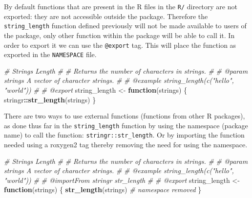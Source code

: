 \documentclass[
]{krantz}
\makeatletter
\newenvironment{Shaded}{\begin{snugshade}}{\end{snugshade}}
\newcommand{\CommentTok}[1]{\textcolor[rgb]{0.37,0.37,0.37}{\textit{#1}}}
\newcommand{\ControlFlowTok}[1]{\textcolor[rgb]{0.27,0.27,0.27}{\textbf{#1}}}
\newcommand{\KeywordTok}[1]{\textcolor[rgb]{0.27,0.27,0.27}{\textbf{#1}}}
\newcommand{\NormalTok}[1]{#1}
\newcommand{\OperatorTok}[1]{\textcolor[rgb]{0.43,0.43,0.43}{\textbf{#1}}}
\newcommand{\StringTok}[1]{\textcolor[rgb]{0.5,0.5,0.5}{#1}}
\newenvironment{kframe}{%
\medskip{}
\setlength{\fboxsep}{.8em}
 \def\at@end@of@kframe{}%
 \ifinner\ifhmode%
  \def\at@end@of@kframe{\end{minipage}}%
  \begin{minipage}{\columnwidth}%
 \fi\fi%
 \def\FrameCommand##1{\hskip\@totalleftmargin \hskip-\fboxsep
 \colorbox{shadecolor}{##1}\hskip-\fboxsep
     \hskip-\linewidth \hskip-\@totalleftmargin \hskip\columnwidth}%
 \MakeFramed {\advance\hsize-\width
   \@totalleftmargin\z@ \linewidth\hsize
   \@setminipage}}%
 {\par\unskip\endMakeFramed%
 \at@end@of@kframe}
\renewenvironment{Shaded}{\begin{kframe}}{\end{kframe}}
\makeatother
\begin{document}
By default functions that are present in the R files in the \texttt{R/} directory are not exported: they are not accessible outside the package. Therefore the \texttt{string\_length} function defined previously will not be made available to users of the package, only other function within the package will be able to call it. In order to export it we can use the \texttt{@export} tag. This will place the function as exported in the \texttt{NAMESPACE} file.

\begin{Shaded}
\begin{Highlighting}[]
\CommentTok{\#\textquotesingle{} Strings Length}
\CommentTok{\#\textquotesingle{} }
\CommentTok{\#\textquotesingle{} Returns the number of characters in strings. }
\CommentTok{\#\textquotesingle{} }
\CommentTok{\#\textquotesingle{} @param strings A vector of character strings.}
\CommentTok{\#\textquotesingle{} }
\CommentTok{\#\textquotesingle{} @example string\_length(c("hello", "world"))}
\CommentTok{\#\textquotesingle{} }
\CommentTok{\#\textquotesingle{} @export}
\NormalTok{string\_length \textless{}{-}}\StringTok{ }\ControlFlowTok{function}\NormalTok{(strings) \{}
\NormalTok{  stringr}\OperatorTok{::}\KeywordTok{str\_length}\NormalTok{(strings)}
\NormalTok{\}}
\end{Highlighting}
\end{Shaded}

There are two ways to use external functions (functions from other R packages), as done thus far in the \texttt{string\_length} function by using the namespace (package name) to call the function: \texttt{stringr::str\_length}. Or by importing the function needed using a roxygen2 tag thereby removing the need for using the namespace.

\begin{Shaded}
\begin{Highlighting}[]
\CommentTok{\#\textquotesingle{} Strings Length}
\CommentTok{\#\textquotesingle{} }
\CommentTok{\#\textquotesingle{} Returns the number of characters in strings. }
\CommentTok{\#\textquotesingle{} }
\CommentTok{\#\textquotesingle{} @param strings A vector of character strings.}
\CommentTok{\#\textquotesingle{} }
\CommentTok{\#\textquotesingle{} @example string\_length(c("hello", "world"))}
\CommentTok{\#\textquotesingle{} }
\CommentTok{\#\textquotesingle{} @importFrom stringr str\_length}
\CommentTok{\#\textquotesingle{} }
\CommentTok{\#\textquotesingle{} @export}
\NormalTok{string\_length \textless{}{-}}\StringTok{ }\ControlFlowTok{function}\NormalTok{(strings) \{}
  \KeywordTok{str\_length}\NormalTok{(strings) }\CommentTok{\# namespace removed}
\NormalTok{\}}
\end{Highlighting}
\end{Shaded}
\end{document}
